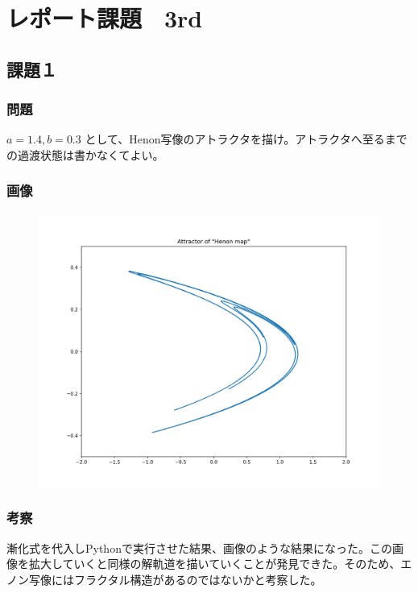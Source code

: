 \section{レポート課題　3rd}
\subsection{課題１}
\subsubsection{問題}
$a = 1.4, b = 0.3$ として、Henon写像のアトラクタを描け。アトラクタへ至るまでの過渡状態は書かなくてよい。
\subsubsection{画像}
\begin{figure}[htbp]
  \centering
  \includegraphics[keepaspectratio, scale=0.5]{images/Problem8/task8_1.png}
\end{figure}
\subsubsection{考察}
漸化式を代入しPythonで実行させた結果、画像のような結果になった。この画像を拡大していくと同様の解軌道を描いていくことが発見できた。そのため、エノン写像にはフラクタル構造があるのではないかと考察した。
